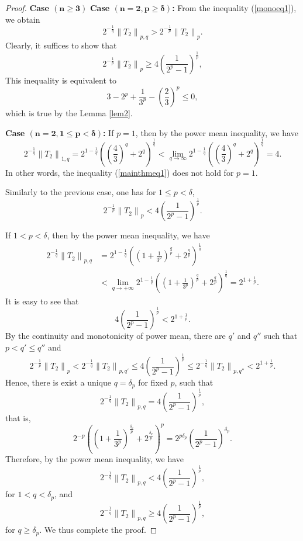 \documentclass[10pt,a4paper]{amsart}
\begin{document}
\begin{proof} {\bf Case $\boldsymbol{(n\geq3)}$}
{\bf Case $\boldsymbol{(n=2, p\geq\delta)}$:}  From the inequality (\ref{monoeq1}), we obtain
$$
2^{-\frac{1}{q}}\left\|T_{2}\right\|_{p,q}>2^{-\frac{1}{p}}\left\|T_{2}\right\|_{p}.
$$
Clearly, it suffices to show that 
\begin{equation}\label{eq12}
2^{-\frac{1}{p}}\left\|T_{2}\right\|_{p} \geq 4\left(\frac{1}{2^{p}-1}\right)^{\frac{1}{p}},
\end{equation}
This inequality is equivalent to
 $$3-2^p+\frac{1}{3^p}-\left(\frac{2}{3}\right)^p\leq0,$$
which is true by the Lemma \ref{lem2}.

 {\bf Case $\boldsymbol{(n=2, 1\leq p<\delta)}$:} If $p=1$, then by the power mean inequality, we have
$$2^{-\frac{1}{q}}\left\|T_{2}\right\|_{1, q}=2^{1-\frac{1}{q}}\left(\left(\frac{4}{3}\right)^q+2^q\right)^\frac{1}{q}<\lim_{q\to\infty}2^{1-\frac{1}{q}}\left(\left(\frac{4}{3}\right)^q+2^q\right)^\frac{1}{q}=4.$$
In other words, the inequality (\ref{mainthmeq1}) does not hold for $p=1$.
 
Similarly to the previous case, one has for $1\leq p<\delta$,
\begin{equation}\label{thmeqq2}
2^{-\frac{1}{p}}\left\|T_{2}\right\|_{p} < 4\left(\frac{1}{2^{p}-1}\right)^{\frac{1}{p}}.
\end{equation}


If $1< p<\delta$, then by the power mean inequality, we have  
\begin{align*}
2^{-\frac{1}{q}}\left\|T_{2}\right\|_{p,q}&=2^{1-\frac{1}{q}}\left(\left(1+\frac{1}{3^p}\right)^\frac{q}{p}+2^\frac{q}{p}\right)^\frac{1}{q}\\
&<\lim_{q\to+\infty}2^{1-\frac{1}{q}}\left(\left(1+\frac{1}{3^p}\right)^\frac{q}{p}+2^\frac{q}{p}\right)^\frac{1}{q}=2^{1+\frac{1}{p}}.
\end{align*}
It is easy to see that
$$4\left(\frac{1}{2^{p}-1}\right)^{\frac{1}{p}}<2^{1+\frac{1}{p}}.$$
By the continuity and monotonicity of power mean, there are $q'$ and $q''$ such that $p<q'\leq q''$ and 
$$
2^{-\frac{1}{p}}\left\|T_{2}\right\|_{p}<2^{-\frac{1}{q}}\left\|T_{2}\right\|_{p, q'}\leq4\left(\frac{1}{2^p-1}\right)^{\frac{1}{p}}\leq2^{-\frac{1}{q}}\left\|T_{2}\right\|_{p, q''}<2^{1+\frac{1}{p}}.
$$
Hence, there is exist a unique $q=\delta_p$ for fixed $p$, such that
$$2^{-\frac{1}{q}}\left\|T_{2}\right\|_{p,q}=4\left(\frac{1}{2^p-1}\right)^{\frac{1}{p}},$$
that is,
$$2^{-p}\left(\left(1+\frac{1}{3^p}\right)^\frac{\delta_p}{p}+2^\frac{\delta_p}{p}\right)^p=2^{p\delta_p}\left(\frac{1}{2^p-1}\right)^{\delta_p}.$$
Therefore, by the power mean inequality, we have
$$
2^{-\frac{1}{q}}\left\|T_{2}\right\|_{p,q}<4\left(\frac{1}{2^{p}-1}\right)^{\frac{1}{p}},
$$
for $1<q<\delta_p$, and 
$$
2^{-\frac{1}{q}}\left\|T_{2}\right\|_{p,q}\geq4\left(\frac{1}{2^{p}-1}\right)^{\frac{1}{p}},
$$
for $q\geq\delta_p$. We thus complete the proof.
\end{proof}
\end{document}
